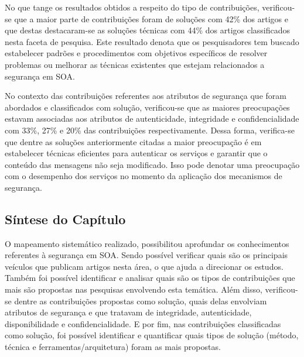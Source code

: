 No que tange os resultados obtidos a respeito do tipo de contribuições, verificou-se que a maior parte de contribuições foram de soluções com 42\% dos artigos e que destas destacaram-se as soluções técnicas com 44\% dos artigos classificados nesta faceta de pesquisa. Este resultado denota que os pesquisadores tem buscado estabelecer padrões e procedimentos  com objetivos específicos de resolver problemas ou melhorar as técnicas existentes que estejam  relacionados a segurança em SOA.

No contexto das contribuições referentes aos atributos de segurança que foram abordados e classificados com solução, verificou-se que as maiores preocupações estavam associadas aos atributos de  autenticidade, integridade e confidencialidade com 33\%, 27\% e 20\% das contribuições respectivamente. Dessa forma, verifica-se que dentre as soluções anteriormente citadas a maior preocupação é em estabelecer técnicas eficientes para autenticar os serviços e garantir que o conteúdo das mensagens não seja modificado. Isso pode denotar uma preocupação com o desempenho dos serviços no momento da aplicação dos mecanismos de segurança.
%


\subsection{Síntese do Capítulo}

O mapeamento sistemático realizado, possibilitou aprofundar os conhecimentos referentes à segurança em SOA. Sendo possível verificar quais são os principais veículos que publicam artigos nesta área, o que ajuda a direcionar os estudos. Também foi possível identificar e analisar quais são os tipos de contribuições que mais são propostas nas pesquisas envolvendo esta temática. Além disso, verificou-se dentre as contribuições propostas como solução, quais delas envolviam atributos de segurança e que tratavam de integridade, autenticidade, disponibilidade e confidencialidade. E por fim, nas contribuições classificadas como solução, foi possível identificar e quantificar quais tipos de solução (método, técnica e ferramentas/arquitetura) foram as mais propostas.

